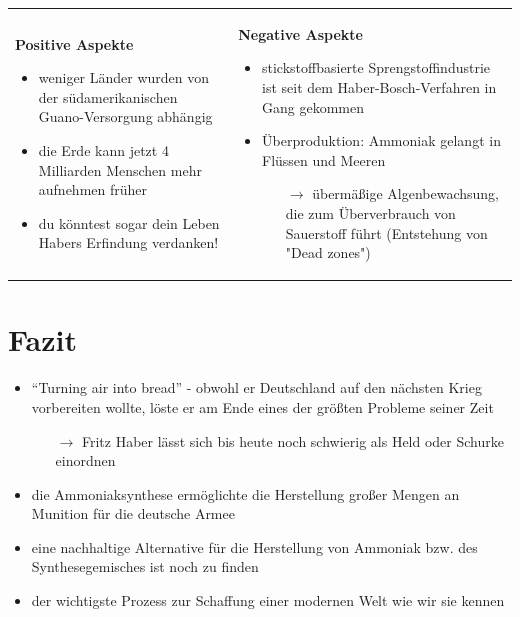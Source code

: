 \documentclass[11pt]{article}
\begin{document}
        \begin{tabular}{m{7.5cm} | m{8.5cm}} 
            \textbf{Positive Aspekte}
            \begin{itemize}
                \item weniger Länder wurden von der südamerikanischen Guano-Versorgung abhängig
                \item die Erde kann jetzt 4 Milliarden Menschen mehr aufnehmen früher
                \item du könntest sogar dein Leben Habers Erfindung verdanken!
            \end{itemize} 
&
            \textbf{Negative Aspekte}
            \begin{itemize}
                  \item stickstoffbasierte Sprengstoffindustrie ist seit dem Haber-Bosch-Verfahren in Gang gekommen
                  \item Überproduktion: Ammoniak gelangt in Flüssen und Meeren
                \begin{itemize}
                    \item[$\rightarrow$] übermäßige Algenbewachsung, die zum Überverbrauch von Sauerstoff führt (Entstehung von "Dead zones")
                \end{itemize}
            \end{itemize}
        \end{tabular}

\section*{Fazit}
\begin{itemize}
    \item ``Turning air into bread'' - obwohl er Deutschland auf den nächsten Krieg vorbereiten wollte, löste er am Ende eines der größten Probleme seiner Zeit
    \begin{itemize}
        \item[$\rightarrow$] Fritz Haber lässt sich bis heute noch schwierig als Held oder Schurke einordnen
    \end{itemize} 
    \item die Ammoniaksynthese ermöglichte die Herstellung großer Mengen an Munition für die deutsche Armee
    \item eine nachhaltige Alternative für die Herstellung von Ammoniak bzw. des Synthesegemisches ist noch zu finden
    \item der wichtigste Prozess zur Schaffung einer modernen Welt wie wir sie kennen
\end{itemize}
\end{document}
